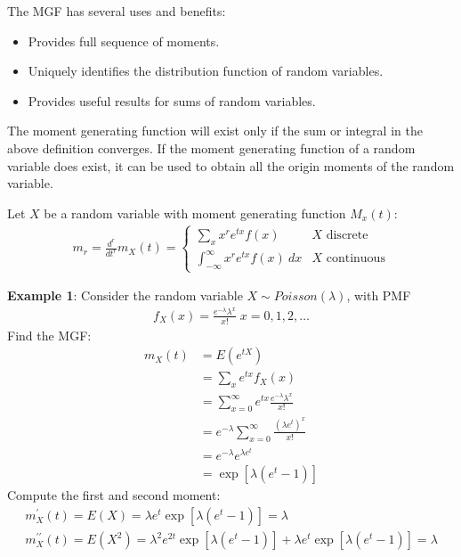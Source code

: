 \documentclass[10pt,a4paper]{article}
\begin{document}
The MGF has several uses and benefits:
\begin{itemize}
    \item Provides full sequence of moments.
    \item Uniquely identifies the distribution function of random variables.
    \item Provides useful results for sums of random variables.
\end{itemize}

The moment generating function will exist only if the sum or integral in the above definition
converges. If the moment generating function of a random variable does exist, it can be used to
obtain all the origin moments of the random variable.

\begin{tcolorbox}[breakable,colback=white]
    Let $X$ be a random variable with moment generating function $M_x(t)$:
    \begin{align*}
        m_r = \frac{d^{r}}{dt^r}m_X(t) = 
        \begin{cases}
            \sum_x x^r e^{tx} f(x) & X \text{ discrete} \\
            \int_{-\infty}^{\infty} x^r e^{tx} f(x) \: dx & X \text{ continuous} 
        \end{cases} 
    \end{align*}
\end{tcolorbox}

\textbf{Example 1}: Consider the random variable $X \sim Poisson(\lambda)$, with PMF
\begin{align*}
    f_X(x) = \frac{e^{-\lambda}\lambda^x}{x!} \; x = 0,1,2,\dots
\end{align*}
Find the MGF:
\begin{align*}
    m_X(t) &= E(e^{tX})\\
    &= \sum_x e^{tx} f_X(x) \\
    &= \sum_{x=0}^{\infty} e^{tx} \frac{e^{-\lambda}\lambda^x}{x!} \\
    &= e^{-\lambda} \sum_{x=0}^{\infty} \frac{(\lambda e^t)^x}{x!} \\
    &= e^{-\lambda}e^{\lambda e^t} \\
    &= \exp[\lambda(e^t - 1)]
\end{align*}
Compute the first and second moment:
\begin{gather*}
    m_X^\prime (t) = E(X) = \lambda e^t \exp[\lambda (e^t - 1)] = \lambda\\
    m_X^{\prime \prime}(t) = E(X^2) = \lambda^2 e^{2t} \exp[\lambda (e^t - 1)] + \lambda e^t \exp[\lambda (e^t - 1)] = \lambda
\end{gather*}
\end{document}
